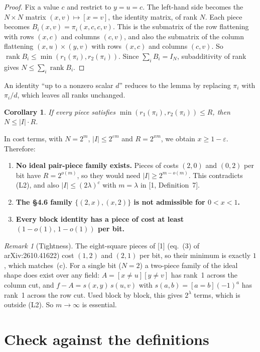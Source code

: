 \documentclass[11pt]{article}
\newtheorem{corollary}[lemma]{Corollary}
\theoremstyle{remark}
\newtheorem*{remark}{Remark}
\newcommand{\rk}{\operatorname{rank}}
\begin{document}
\begin{proof}
Fix a value $c$ and restrict to $y=u=c$.
The left-hand side becomes the $N\times N$ matrix $(x,v)\mapsto[x=v]$, the identity matrix, of rank $N$.
Each piece becomes $B_i(x,v)=\pi_i(x,c,c,v)$.
This is the submatrix of the row flattening with rows $(x,c)$ and columns $(c,v)$, and also the submatrix of the column flattening $(x,u)\times(y,v)$ with rows $(x,c)$ and columns $(c,v)$.
So $\rk B_i\le\min(r_1(\pi_i),r_2(\pi_i))$.
Since $\sum_i B_i=I_N$, subadditivity of rank gives $N\le\sum_i\rk B_i$.
\end{proof}

An identity ``up to a nonzero scalar $d$'' reduces to the lemma by replacing $\pi_i$ with $\pi_i/d$, which leaves all ranks unchanged.

\begin{corollary}\label{cor:quant}
If every piece satisfies $\min(r_1(\pi_i),r_2(\pi_i))\le R$, then $N\le|I|\cdot R$.
\end{corollary}

In cost terms, with $N=2^m$, $|I|\le 2^{\varepsilon m}$ and $R=2^{xm}$, we obtain $x\ge 1-\varepsilon$. Therefore:
\begin{enumerate}
\item[(a)] \textbf{No ideal pair-piece family exists.} Pieces of costs $(2,0)$ and $(0,2)$ per bit have $R=2^{o(m)}$, so they would need $|I|\ge 2^{m-o(m)}$. This contradicts (L2), and also $|I|\le(2\lambda)^c$ with $m=\lambda$ in [1, Definition~7].
\item[(b)] \textbf{The \S4.6 family $\{(2,x),(x,2)\}$ is not admissible for $0<x<1$.}
\item[(c)] \textbf{Every block identity has a piece of cost at least $(1-o(1),\,1-o(1))$ per bit.}
\end{enumerate}

\begin{remark}[Tightness]
The eight-square pieces of [1] (eq.~(3) of arXiv:2610.41622) cost $(1,2)$ and $(2,1)$ per bit, so their minimum is exactly $1$, which matches~(c).
For a single bit ($N=2$) a two-piece family of the ideal shape does exist over any field: $A=[x\ne u][y\ne v]$ has rank~1 across the column cut, and $f-A=s(x,y)\,s(u,v)$ with $s(a,b)=[a=b](-1)^a$ has rank~1 across the row cut.
Used block by block, this gives $2^\lambda$ terms, which is outside (L2).
So $m\to\infty$ is essential.
\end{remark}

\section{Check against the definitions}
\end{document}
